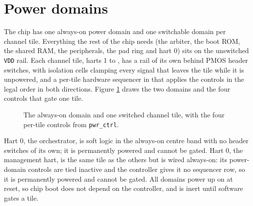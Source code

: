 \section{Power domains} \label{s:powerdomains}

The chip has one always-on power domain and one switchable domain per channel tile. Everything the rest of the chip needs (the arbiter, the boot ROM, the shared RAM, the peripherals, the pad ring and hart 0) sits on the unswitched \texttt{VDD} rail. Each channel tile, harts 1 to \MaxHartIndex{}, has a rail of its own behind PMOS header switches, with isolation cells clamping every signal that leaves the tile while it is unpowered, and a per-tile hardware sequencer in  that applies the controls in the legal order in both directions. Figure \ref{fig:pwr-domains} draws the two domains and the four controls that gate one tile.

\begin{figure}[htpb]
	\centering
	
	\caption{The always-on domain and one switched channel tile, with the four per-tile controls from \texttt{pwr\_ctrl}.}
	\label{fig:pwr-domains}
\end{figure}

\iforchpresent
Hart 0, the orchestrator, is soft logic in the always-on centre band with no header switches of its own; it is permanently powered and cannot be gated.
\else
Hart 0, the management hart, is the same tile as the others but is wired always-on: its power-domain controls are tied inactive and the controller gives it no sequencer row, so it is permanently powered and cannot be gated.
\fi{}
All domains power up on at reset, so chip boot does not depend on the controller, and  is inert until software gates a tile.

